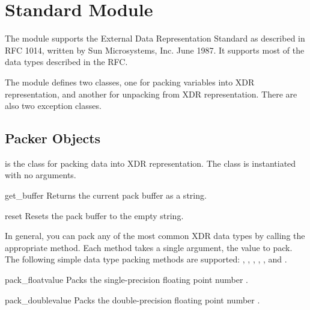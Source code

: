 \section{Standard Module }
\label{module-xdrlib}

\renewcommand{\indexsubitem}{(in module xdrlib)}


The  module supports the External Data Representation
Standard as described in RFC 1014, written by Sun Microsystems,
Inc. June 1987.  It supports most of the data types described in the
RFC.

The  module defines two classes, one for packing
variables into XDR representation, and another for unpacking from XDR
representation.  There are also two exception classes.


\subsection{Packer Objects}

 is the class for packing data into XDR representation.
The  class is instantiated with no arguments.

\begin{funcdesc}{get_buffer}{}
Returns the current pack buffer as a string.
\end{funcdesc}

\begin{funcdesc}{reset}{}
Resets the pack buffer to the empty string.
\end{funcdesc}

In general, you can pack any of the most common XDR data types by
calling the appropriate  method.  Each method
takes a single argument, the value to pack.  The following simple data
type packing methods are supported: , ,
, , ,
and .

\begin{funcdesc}{pack_float}{value}
Packs the single-precision floating point number .
\end{funcdesc}

\begin{funcdesc}{pack_double}{value}
Packs the double-precision floating point number .
\end{funcdesc}

